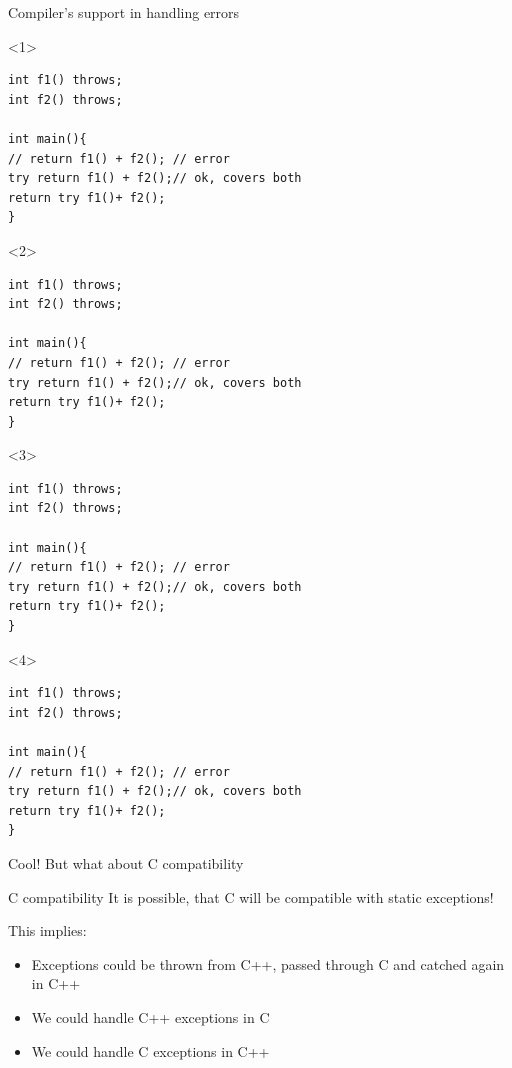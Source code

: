 \documentclass[10pt]{beamer}
\begin{document}
\begin{frame}[fragile]{Compiler's support in handling errors}

	\begin{onlyenv}
	\begin{verbatim}
int f1() throws;	
int f2() throws;

int main(){
// return f1() + f2(); // error
try return f1() + f2();// ok, covers both 
return try f1()+ f2();
}
	\end{verbatim}
	\end{onlyenv}

	\begin{onlyenv}
	\begin{verbatim}
int f1() throws;	
int f2() throws;

int main(){
// return f1() + f2(); // error
try return f1() + f2();// ok, covers both 
return try f1()+ f2();
}
	\end{verbatim}
	\end{onlyenv}

	\begin{onlyenv}
	\begin{verbatim}
int f1() throws;	
int f2() throws;

int main(){
// return f1() + f2(); // error
try return f1() + f2();// ok, covers both 
return try f1()+ f2();
}
	\end{verbatim}
	\end{onlyenv}

	\begin{onlyenv}
	\begin{verbatim}
int f1() throws;	
int f2() throws;

int main(){
// return f1() + f2(); // error
try return f1() + f2();// ok, covers both 
return try f1()+ f2();
}
	\end{verbatim}
	\end{onlyenv}

\end{frame}

\begin{frame}{Cool! But what about C compatibility}
	\begin{alertblock}{C compatibility}
 		It is possible, that C will be compatible with static exceptions!
	\end{alertblock}

	
	This implies:
	
	\begin{itemize}
		\item Exceptions could be thrown from C++, passed through C and catched again in C++
		\item We could handle C++ exceptions in C
		\item We could handle C exceptions in C++
	\end{itemize}
\end{frame}
\end{document}
